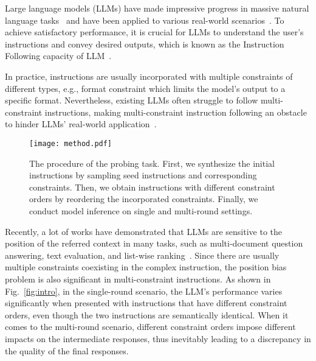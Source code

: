 




Large language models (LLMs) have made impressive progress in massive natural language tasks~\cite{wan2024tnt, zhang2024linkner} and have been applied to various real-world scenarios~\cite{bai2023qwen, bi2024deepseek}. To achieve satisfactory performance, it is crucial for LLMs to understand the user's instructions and convey desired outputs, which is known as the Instruction Following capacity of LLM~\cite{yin2023llm, xu2024wizardlm}. 


In practice, instructions are usually incorporated with multiple constraints of different types, e.g., format constraint which limits the model's output to a specific format. Nevertheless, existing LLMs often struggle to follow multi-constraint instructions, making multi-constraint instruction following an obstacle to hinder LLMs' real-world application~\cite{wen2024benchmarking, yin2023llm}.


\begin{figure*}[t] 
    \centering
            \texttt{[image: method.pdf]}
    \caption{The procedure of the probing task. First, we synthesize the initial instructions by sampling seed instructions and corresponding constraints. Then, we obtain instructions with different constraint orders by reordering the incorporated constraints. Finally, we conduct model inference on single and multi-round settings.}
    \label{fig:method}
\end{figure*}

Recently, a lot of works have demonstrated that LLMs are sensitive to the position of the referred context in many tasks, such as multi-document question answering, text evaluation, and list-wise ranking~\cite{liu2024lost,zheng2023judging, tang2024found}. Since there are usually multiple constraints coexisting in the complex instruction, the position bias problem is also significant in multi-constraint instructions. As shown in Fig.~\ref{fig:intro}, in the single-round scenario, the LLM's performance varies significantly when presented with instructions that have different constraint orders, even though the two instructions are semantically identical. When it comes to the multi-round scenario, different constraint orders impose different impacts on the intermediate responses, thus inevitably leading to a discrepancy in the quality of the final responses.

